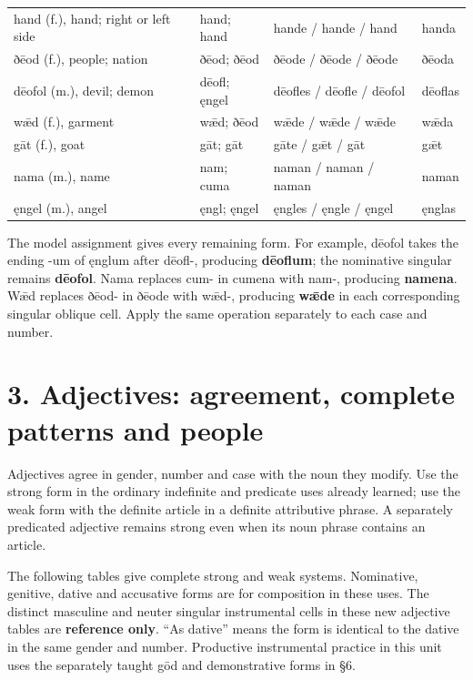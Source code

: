 \begin{longtable}{@{}>{\raggedright\arraybackslash}p{37.19mm}>{\raggedright\arraybackslash}p{22.35mm}>{\raggedright\arraybackslash}p{33.52mm}>{\raggedright\arraybackslash}p{22.5mm}@{}}
hand (f.), hand; right or left side & hand; hand & hande /\allowbreak{} hande /\allowbreak{} hand & handa \\
ðēod (f.), people; nation & ðēod; ðēod & ðēode /\allowbreak{} ðēode /\allowbreak{} ðēode & ðēoda \\
dēofol (m.), devil; demon & dēofl; ęngel & dēofles /\allowbreak{} dēofle /\allowbreak{} dēofol & dēoflas \\
wǣd (f.), garment & wǣd; ðēod & wǣde /\allowbreak{} wǣde /\allowbreak{} wǣde & wǣda \\
gāt (f.), goat & gāt; gāt & gāte /\allowbreak{} gǣt /\allowbreak{} gāt & gǣt \\
nama (m.), name & nam; cuma & naman /\allowbreak{} naman /\allowbreak{} naman & naman \\
ęngel (m.), angel & ęngl; ęngel & ęngles /\allowbreak{} ęngle /\allowbreak{} ęngel & ęnglas \\
\end{longtable}
\par\endgroup

The model assignment gives every remaining form. For example, dēofol takes the ending -um of ęnglum after dēofl-, producing \textbf{dēoflum}; the nominative singular remains \textbf{dēofol}. Nama replaces cum- in cumena with nam-, producing \textbf{namena}. Wǣd replaces ðēod- in ðēode with wǣd-, producing \textbf{wǣde} in each corresponding singular oblique cell. Apply the same operation separately to each case and number.

\section*{3. Adjectives: agreement, complete patterns and people}

Adjectives agree in gender, number and case with the noun they modify. Use the strong form in the ordinary indefinite and predicate uses already learned; use the weak form with the definite article in a definite attributive phrase. A separately predicated adjective remains strong even when its noun phrase contains an article.

The following tables give complete strong and weak systems. Nominative, genitive, dative and accusative forms are for composition in these uses. The distinct masculine and neuter singular instrumental cells in these new adjective tables are \textbf{reference only}. “As dative” means the form is identical to the dative in the same gender and number. Productive instrumental practice in this unit uses the separately taught gōd and demonstrative forms in §6.

